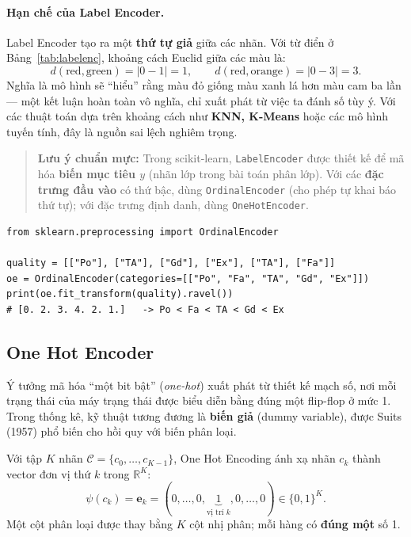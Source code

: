 \paragraph{Hạn chế của Label Encoder.} Label Encoder tạo ra một \textbf{thứ tự giả} giữa các nhãn. Với từ điển ở Bảng~\ref{tab:labelenc}, khoảng cách Euclid giữa các màu là:
\begin{equation}
    d(\text{red}, \text{green}) = |0 - 1| = 1, \qquad d(\text{red}, \text{orange}) = |0 - 3| = 3 .
\end{equation}
Nghĩa là mô hình sẽ ``hiểu'' rằng màu đỏ giống màu xanh lá hơn màu cam ba lần --- một kết luận hoàn toàn vô nghĩa, chỉ xuất phát từ việc ta đánh số tùy ý. Với các thuật toán dựa trên khoảng cách như \textbf{KNN, K-Means} hoặc các mô hình tuyến tính, đây là nguồn sai lệch nghiêm trọng.

\begin{quote}
\textbf{Lưu ý chuẩn mực:} Trong scikit-learn, \texttt{LabelEncoder} được thiết kế để mã hóa \textbf{biến mục tiêu $y$} (nhãn lớp trong bài toán phân lớp). Với các \textbf{đặc trưng đầu vào} có thứ bậc, dùng \texttt{OrdinalEncoder} (cho phép tự khai báo thứ tự); với đặc trưng định danh, dùng \texttt{OneHotEncoder}.
\end{quote}

\begin{lstlisting}[caption={Ordinal Encoder với thứ tự do người dùng khai báo}]
from sklearn.preprocessing import OrdinalEncoder

quality = [["Po"], ["TA"], ["Gd"], ["Ex"], ["TA"], ["Fa"]]
oe = OrdinalEncoder(categories=[["Po", "Fa", "TA", "Gd", "Ex"]])
print(oe.fit_transform(quality).ravel())
# [0. 2. 3. 4. 2. 1.]   -> Po < Fa < TA < Gd < Ex
\end{lstlisting}

\subsection{One Hot Encoder}

Ý tưởng mã hóa ``một bit bật'' (\textit{one-hot}) xuất phát từ thiết kế mạch số, nơi mỗi trạng thái của máy trạng thái được biểu diễn bằng đúng một flip-flop ở mức 1. Trong thống kê, kỹ thuật tương đương là \textbf{biến giả} (dummy variable), được Suits (1957) phổ biến cho hồi quy với biến phân loại.

\begin{definition}
Với tập $K$ nhãn $\mathcal{C} = \{c_0, \dots, c_{K-1}\}$, One Hot Encoding ánh xạ nhãn $c_k$ thành vector đơn vị thứ $k$ trong $\mathbb{R}^K$:
\begin{equation}
    \psi(c_k) = \mathbf{e}_k = (0, \dots, 0, \underbrace{1}_{\text{vị trí } k}, 0, \dots, 0) \in \{0,1\}^K .
\end{equation}
Một cột phân loại được thay bằng $K$ cột nhị phân; mỗi hàng có \textbf{đúng một} số 1.
\end{definition}


